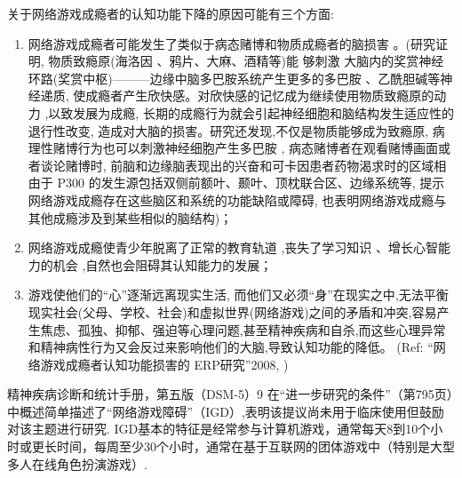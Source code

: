  关于网络游戏成瘾者的认知功能下降的原因可能有三个方面:
\begin{enumerate}
\item 网络游戏成瘾者可能发生了类似于病态赌博和物质成瘾者的脑损害 。(研究证明, 物质致瘾原(海洛因 、鸦片、大麻、酒精等)能 够刺激 大脑内的奖赏神经环路(奖赏中枢)———边缘中脑多巴胺系统产生更多的多巴胺 、乙酰胆碱等神经递质, 使成瘾者产生欣快感。对欣快感的记忆成为继续使用物质致瘾原的动力 ,以致发展为成瘾, 长期的成瘾行为就会引起神经细胞和脑结构发生适应性的退行性改变, 造成对大脑的损害。研究还发现,不仅是物质能够成为致瘾原, 病理性赌博行为也可以刺激神经细胞产生多巴胺 , 病态赌博者在观看赌博画面或者谈论赌博时, 前脑和边缘脑表现出的兴奋和可卡因患者药物渴求时的区域相由于 P300 的发生源包括双侧前额叶、颞叶、顶枕联合区、边缘系统等, 提示网络游戏成瘾存在这些脑区和系统的功能缺陷或障碍, 也表明网络游戏成瘾与其他成瘾涉及到某些相似的脑结构)；
\item 网络游戏成瘾使青少年脱离了正常的教育轨道 ,丧失了学习知识 、增长心智能力的机会 ,自然也会阻碍其认知能力的发展；
\item  游戏使他们的“心”逐渐远离现实生活, 而他们又必须“身”在现实之中,无法平衡现实社会(父母、学校、社会)和虚拟世界(网络游戏)之间的矛盾和冲突,容易产生焦虑、孤独、抑郁、强迫等心理问题,甚至精神疾病和自杀,而这些心理异常和精神病性行为又会反过来影响他们的大脑,导致认知功能的降低。
                (Ref:   “网络游戏成瘾者认知功能损害的 ERP研究”2008, \cite{})
 \end{enumerate}






精神疾病诊断和统计手册，第五版（DSM-5）9 在“进一步研究的条件”（第795页）中概述简单描述了“网络游戏障碍”（IGD）,表明该提议尚未用于临床使用但鼓励对该主题进行研究. IGD基本的特征是经常参与计算机游戏，通常每天8到10个小时或更长时间，每周至少30个小时，通常在基于互联网的团体游戏中（特别是大型多人在线角色扮演游戏）.




